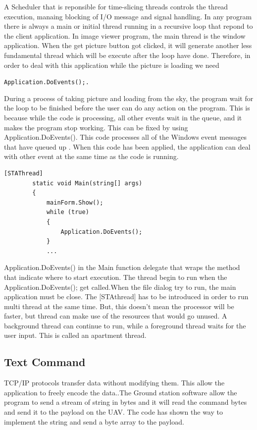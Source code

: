 A Scheduler that is reponsible for time-slicing threads controls the thread execution, manaing blocking of I/O message and signal handling\cite{keithC}. In any program there is always a main or initial thread running in a recursive loop that repond to the client application. In image viewer program, the main thread is the window application. When the get picture button got clicked, it will generate another less fundamental thread which will be execute after the loop have done. Therefore, in order to deal with this application while the picture is loading we need

\begin{center}
\texttt{Application.DoEvents();.}
\end{center}

During a process of taking picture and loading from the sky, the program wait for the loop to be finished before the user can do any action on the program. This is because while the code is processing, all other events wait in the queue, and it makes the program stop working. This can be fixed by using Application.DoEvents(). This code processes all of the Windows event messages that have queued up \cite{davidW}. When this code has been applied, the application can deal with other event at the same time as the code is running.


\begin{lstlisting}[caption={thread handling in the main},label=lst:threadH]
        [STAThread]        
        static void Main(string[] args)        
        {        
            mainForm.Show();
            while (true)            
            {            
                Application.DoEvents();                
            }
        	...
        \end{lstlisting}
        Application.DoEvents() in the Main function delegate that wraps the method that indicate where to start execution. The thread begin to run when the Application.DoEvents(); get called\cite{xieX}.When the file dialog try to run, the main application must be close. The [STAthread] has to be introduced in order to run multi thread at the same time. But, this doesn't mean the processor will be faster, but thread can make use of the resources that would go unused. A background thread can continue to run, while a foreground thread waits for the user input. This is called an apartment thread. 
        
\subsection{Text Command}
TCP/IP protocols transfer data without modifying them. This allow the application to freely encode the data.\cite{davidB}.The Ground station software allow the program to send a stream of string in bytes and it will read the command bytes and send it to the payload on the UAV. The code has shown the way to implement the string and send a byte array to the payload.
	
